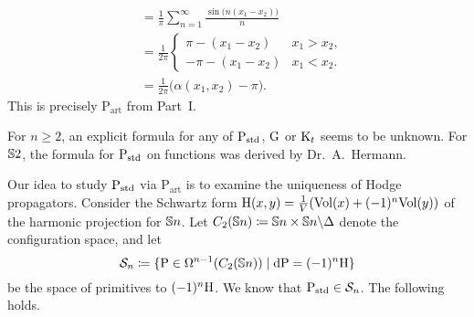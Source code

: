\documentclass[\MainFolder/Text.tex]{subfiles}
\newcommand{\Soln}{\mathcal{S}}
\newcommand{\ArtPrpg}{\mathrm{P}_{\mathrm{art}}}
\begin{document}
\begin{Example}
\begin{align*}
&= \frac{1}{\pi}\sum_{n=1}^\infty\frac{\sin\bigl(n(x_1-x_2)\bigr)}{n} \\
& = \frac{1}{2\pi} \begin{cases}
\pi - (x_1 - x_2) & x_1 > x_2, \\
-\pi - (x_1-x_2) & x_1< x_2.
\end{cases} \\
& = \frac{1}{2\pi}\bigl(\alpha(x_1,x_2) - \pi\bigr).
\end{align*}
This is precisely $\ArtPrpg$ from Part~I.
\end{Example}

For $n\ge 2$, an explicit formula for any of $\mathrm{P}_{\mathrm{std}}$, $\mathrm{G}$ or $\mathrm{K}_t$ seems to be unknown. For $\mathbb{S}{2}$, the formula for $\mathrm{P}_{\mathrm{std}}$ on functions was derived by Dr.~A.~Hermann.


Our idea to study $\mathrm{P}_{\mathrm{std}}$ via $\ArtPrpg$ is to examine the uniqueness of Hodge propagators. Consider the Schwartz form $\mathrm{H}(x,y) = \frac{1}{V}(\mathrm{Vol}(x) + (-1)^n\mathrm{Vol}(y))$ of the harmonic projection for $\mathbb{S}{n}$. Let $C_2(\mathbb{S}{n})\coloneqq\mathbb{S}{n}\times\mathbb{S}{n}\backslash\Delta$ denote the configuration space, and let
\begin{equation}\label{Eq:DifEq}
\Soln_n\coloneqq\{\Prpg\in\DR^{n-1}(C_2(\Sph{n}))\mid\Dd\Prpg=(-1)^n\HKer\}
\end{equation}
be the space of primitives to $(-1)^n\mathrm{H}$. We know that $\StdPrpg\in \Soln_n$. The following holds.
\end{document}
